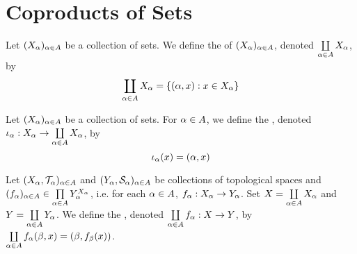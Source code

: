 \documentclass{book}
\begin{document}
	
	
	
	
	
	
	
	
	
	
	
	
	
	
	
	
	
	
	
	
	
	
	
	
	
	
	\newpage
	\section{Coproducts of Sets}
	
	\begin{defn} 
		Let $(X_{\alpha})_{\alpha \in A}$ be a collection of sets. We define the  of $(X_{\alpha})_{\alpha \in A}$, denoted $\coprod\limits_{\alpha \in A}X_{\alpha}$, by 
		\begin{equation*}
			\coprod_{\alpha \in A}X_{\alpha} = \{(\alpha, x): x \in X_{\alpha} \}
		\end{equation*}
	\end{defn}
	
	\begin{defn} 
		Let $(X_{\alpha})_{\alpha \in A}$ be a collection of sets. For $\alpha \in A$, we define the , denoted $\iota_{\alpha}: X_{\alpha} \rightarrow \coprod\limits_{\alpha \in A}X_{\alpha}$, by 
		\begin{equation*}
			\iota_{\alpha}(x) = (\alpha, x)
		\end{equation*}
	\end{defn}

	\begin{defn} 
		Let $(X_{\alpha}, \mathcal{T}_{\alpha})_{\alpha \in A}$ and $(Y_{\alpha}, \mathcal{S}_{\alpha})_{\alpha \in A}$ be collections of topological spaces and $(f_{\alpha})_{\alpha \in A} \in \prod\limits_{\alpha \in A} Y_{\alpha}^{X_{\alpha}}$, i.e. for each $\alpha \in A$, $f_{\alpha}:X_{\alpha} \rightarrow Y_{\alpha}$. Set $X = \coprod\limits_{\alpha \in A} X_{\alpha}$ and $Y = \coprod\limits_{\alpha \in A}Y_{\alpha}$. We define the , denoted $\coprod\limits_{\alpha \in A} f_{\alpha}: X \rightarrow Y$, by $\coprod\limits_{\alpha \in A} f_{\alpha} (\beta, x) = (\beta, f_{\beta}(x))$.
	\end{defn}
\end{document}
